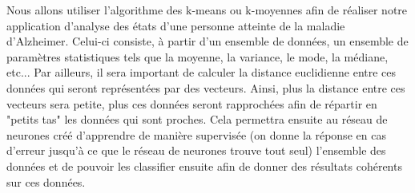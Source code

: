 		Nous allons utiliser l'algorithme des k-means ou k-moyennes afin de réaliser notre application d'analyse des états d'une personne atteinte de la maladie d'Alzheimer. Celui-ci consiste, à partir d'un ensemble de données, un ensemble de paramètres statistiques tels que la moyenne, la variance, le mode, la médiane, etc... Par ailleurs, il sera important de calculer la distance euclidienne entre ces données qui seront représentées par des vecteurs. Ainsi, plus la distance entre ces vecteurs sera petite, plus ces données seront rapprochées afin de répartir en "petits tas" les données qui sont proches. Cela permettra ensuite au réseau de neurones créé d'apprendre de manière supervisée (on donne la réponse en cas d'erreur jusqu'à ce que le réseau de neurones trouve tout seul) l'ensemble des données et de pouvoir les classifier ensuite afin de donner des résultats cohérents sur ces données. 
		
